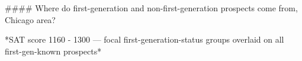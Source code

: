 #### Where do first-generation and non-first-generation prospects come from, Chicago area?

*SAT score 1160 - 1300 — focal first-generation-status groups overlaid on all first-gen-known prospects*
